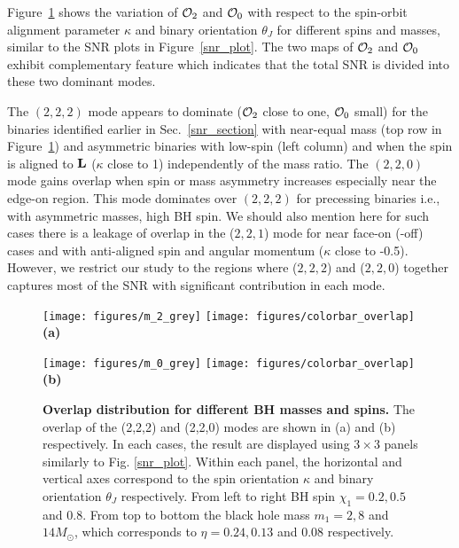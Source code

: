 \documentclass[preprint,onecolumn,,tightenlines,superscriptaddress,showpacs,nofootinbib,eqsecnum,amsfonts,amsmath]{revtex4}
\begin{document}
Figure~\ref{modes} shows the variation of ${\cal{O}}_2$ and ${\cal{O}}_0$ with
respect to the spin-orbit alignment parameter $\kappa$ and binary orientation
$\theta_J$ for different spins and masses, similar to the SNR plots in
Figure~\ref{snr_plot}. The two maps of ${\cal{O}}_2$ and ${\cal{O}}_0$ exhibit
complementary feature which indicates that the total SNR is divided into these
two dominant modes.

The $(2,2,2)$ mode appears to dominate (${\cal O}_2$ close to one, ${\cal O}_0$
small) for the binaries identified earlier in Sec.~\ref{snr_section} with
near-equal mass (top row in Figure~\ref{modes}) and asymmetric binaries with
low-spin (left column) and when the spin is aligned to $\bf{L}$ ($\kappa$ close
to 1) independently of the mass ratio. The $(2,2,0)$ mode gains overlap when
spin or mass asymmetry increases especially near the edge-on region. This mode
dominates over $(2,2,2)$ for precessing binaries i.e., with asymmetric masses,
high BH spin. We should also mention here for such cases there is a leakage of
overlap in the ($2,2,1$) mode for near face-on (-off) cases and with
anti-aligned spin and angular momentum ($\kappa$ close to -0.5). However, we
restrict our study to the regions where ($2,2,2$) and ($2,2,0$) together
captures most of the SNR with significant contribution in each mode.

\begin{figure}[!htbp]

  \centering
  \texttt{[image: figures/m\_2\_grey]}
  \texttt{[image: figures/colorbar\_overlap]}
  \label{fig:sfig1}\\
  \textbf{(a)}
  
  \centering
   \texttt{[image: figures/m\_0\_grey]}
  \texttt{[image: figures/colorbar\_overlap]}
 \label{fig:sfig2}\\ 
 \textbf{(b)}
  
\caption{\textbf{Overlap distribution for different BH masses and spins.} 
The overlap of the (2,2,2) and (2,2,0) modes are shown in (a) and (b) respectively.
In each cases, the result are displayed using $3 \times 3$ panels similarly to Fig. \ref{snr_plot}.
Within each panel, the horizontal and vertical axes correspond to the spin orientation $\kappa$ and binary 
orientation $\theta_J$ respectively. From left to right BH spin $\chi_1 = 0.2, 0.5$ and $0.8$. From top 
to bottom the black hole mass $m_{1} = 2, 8$ and $14 M_{\odot}$, which corresponds to $\eta = 0.24, 0.13$ and $0.08$ respectively.}
\label{modes}
\end{figure}
\end{document}
